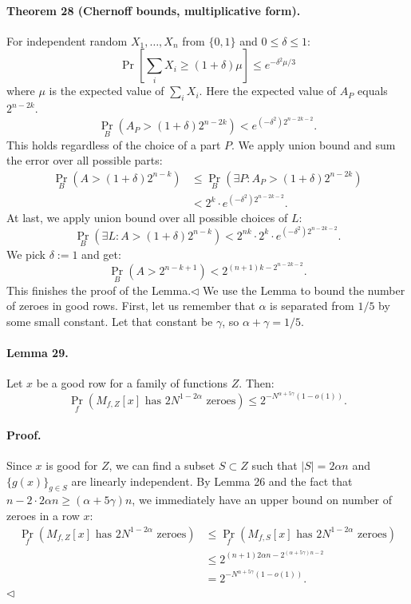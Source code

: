 \paragraph{Theorem 28 (Chernoff bounds, multiplicative form).} For independent random $X_1,\ldots,X_n$ from $\{0,1\}$ and $0\leq\delta\leq1$:
\[\Pr\left[\sum_iX_i\geq(1+\delta)\mu\right]\leq e^{-\delta^2\mu/3}\]
where $\mu$ is the expected value of $\sum_iX_i$.
Here the expected value of $A_P$ equals $2^{n-2k}$.
\[\Pr_B(A_P>(1+\delta)2^{n-2k})<e^{(-\delta^2)2^{n-2k-2}}.\]
This holds regardless of the choice of a part $P$. We apply union bound and sum the error over all possible parts:
\begin{align*}
\Pr_B(A>(1+\delta)2^{n-k})&\leq\Pr_B(\exists P:A_P>(1+\delta)2^{n-2k})\\
&<2^k\cdot e^{(-\delta^2)2^{n-2k-2}}.
\end{align*}
At last, we apply union bound over all possible choices of $L$:
\[\Pr_B(\exists L:A>(1+\delta)2^{n-k})<2^{nk}\cdot2^k\cdot e^{(-\delta^2)2^{n-2k-2}}.\]
We pick $\delta:=1$ and get:
\[\Pr_B(A>2^{n-k+1})<2^{(n+1)k-2^{n-2k-2}}.\]
This finishes the proof of the Lemma.\hfill$\triangleleft$
We use the Lemma to bound the number of zeroes in good rows. First, let us remember that $\alpha$ is separated from $1/5$ by some small constant. Let that constant be $\gamma$, so $\alpha+\gamma=1/5$.
\paragraph{Lemma 29.} Let $x$ be a good row for a family of functions $Z$. Then:
\[\Pr_f(M_{f,Z}[x]\text{ has }2N^{1-2\alpha}\text{ zeroes})\leq2^{-N^{\alpha+5\gamma}(1-o(1))}.\]
\paragraph{Proof.} Since $x$ is good for $Z$, we can find a subset $S\subset Z$ such that $|S|=2\alpha n$ and $\{g(x)\}_{g\in S}$ are linearly independent. By Lemma 26 and the fact that $n-2\cdot2\alpha n\geq(\alpha+5\gamma)n$, we immediately have an upper bound on number of zeroes in a row $x$:
\begin{align*}
\Pr_f(M_{f,Z}[x]\text{ has }2N^{1-2\alpha}\text{ zeroes})
&\leq\Pr_f(M_{f,S}[x]\text{ has }2N^{1-2\alpha}\text{ zeroes})\\
&\leq2^{(n+1)2\alpha n-2^{(\alpha+5\gamma)n-2}}\\
&=2^{-N^{\alpha+5\gamma}(1-o(1))}.
\end{align*}\hfill$\triangleleft$
